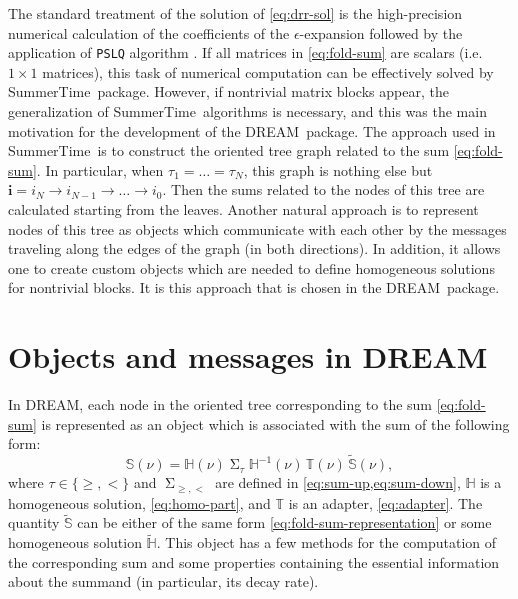 \documentclass[sort&compress]{elsarticle}
\newcommand{\Sum}{\mathop{\Sigma}\nolimits}
\begin{document}
The standard treatment of the solution of \cref{eq:drr-sol} is the high-precision numerical calculation of the coefficients of the $\epsilon$-expansion followed by the application of \texttt{PSLQ} algorithm \cite{FergusonBailey:1992:PSLQ}.
If all matrices in \cref{eq:fold-sum} are scalars (i.e.\ $1\times1$ matrices), this task of numerical computation can be effectively solved by SummerTime\ package.
However, if nontrivial matrix blocks appear, the generalization of SummerTime\ algorithms is necessary, and this was the main motivation for the development of the DREAM\ package.
The approach used in SummerTime\ is to construct the oriented tree graph related to the sum \eqref{eq:fold-sum}.
In particular, when $\tau_1=\ldots=\tau_{N}$, this graph is nothing else but $\bm{i} = i_N \to i_{N-1} \to \ldots \to i_0$.
Then the sums related to the nodes of this tree are calculated starting from the leaves.
Another natural approach is to represent nodes of this tree as objects which communicate with each other by the messages traveling along the edges of the graph (in both directions).
In addition, it allows one to create custom objects which are needed to define homogeneous solutions for nontrivial blocks.
It is this approach that is chosen in the DREAM\ package.

\section{Objects and messages in DREAM}

In DREAM, each node in the oriented tree corresponding to the sum \eqref{eq:fold-sum} is represented as an object which is associated with the sum of the following form:
\begin{equation}
	\label{eq:fold-sum-representation}
	\mathbb{S}(\nu) = \mathbb{H}(\nu)
		\Sum_{\tau} \mathbb{H}^{-1}(\nu) \, \mathbb{T}(\nu) \, \widetilde{\mathbb{S}}(\nu),
\end{equation}
where $\tau \in \{ \geq, < \}$ and $\Sum_{\geq,<}$ are defined in \cref{eq:sum-up,eq:sum-down},
$\mathbb{H}$ is a homogeneous solution, \cref{eq:homo-part}, and $\mathbb{T}$ is an adapter, \cref{eq:adapter}.
The quantity $\widetilde{\mathbb{S}}$ can be either of the same form \eqref{eq:fold-sum-representation} or some homogeneous solution $\widetilde{\mathbb{H}}$.
This object has a few methods for the computation of the corresponding sum and some properties containing the essential information about the summand (in particular, its decay rate).
\end{document}
